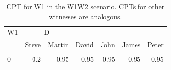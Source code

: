 \documentclass[10pt,]{scrartcl}
\begin{document}
\begin{table}[H]
\centering
\begin{tabular}{lrrrrrr}
\toprule
\multicolumn{1}{c}{W1} & \multicolumn{2}{c}{D} \\
  & Steve & Martin & David & John & James & Peter\\
\midrule
\cellcolor{gray!6}{\cellcolor{gray!6}{1}} & \cellcolor{gray!6}{\cellcolor{gray!6}{0.8}} & \cellcolor{gray!6}{\cellcolor{gray!6}{0.05}} & \cellcolor{gray!6}{\cellcolor{gray!6}{0.05}} & \cellcolor{gray!6}{\cellcolor{gray!6}{0.05}} & \cellcolor{gray!6}{\cellcolor{gray!6}{0.05}} & \cellcolor{gray!6}{\cellcolor{gray!6}{0.05}}\\
0 & 0.2 & 0.95 & 0.95 & 0.95 & 0.95 & 0.95\\
\bottomrule
\end{tabular}
\caption{CPT for \textsf{W1} in the \textsf{W1W2} scenario. CPTs for other witnesses are  analogous.}
\label{tab:w1w2}
\end{table}


\end{document}

